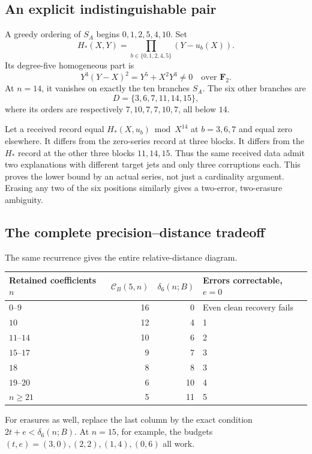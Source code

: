 \documentclass[11pt]{article}
\theoremstyle{definition}
\newcommand{\F}{\mathbf F}
\newcommand{\capv}{\mathcal C}
\begin{document}
\subsection{An explicit indistinguishable pair}

A greedy ordering of $S_A$ begins $0,1,2,5,4,10$. Set
\begin{equation}\label{eq:witness}
 H_*(X,Y)=\prod_{b\in\{0,1,2,4,5\}}(Y-u_b(X)).
\end{equation}
Its degree-five homogeneous part is
\[
 Y^3(Y-X)^2=Y^5+X^2Y^3\ne0\quad\text{over }\F_2.
\]
At $n=14$, it vanishes on exactly the ten branches $S_A$. The six other branches are
\[
 D=\{3,6,7,11,14,15\},
\]
where its orders are respectively $7,10,7,7,10,7$, all below $14$.

Let a received record equal $H_*(X,u_b)\bmod X^{14}$ at $b=3,6,7$ and equal zero elsewhere. It differs from the zero-series record at three blocks. It differs from the $H_*$ record at the other three blocks $11,14,15$. Thus the same received data admit two explanations with different target jets and only three corruptions each. This proves the lower bound by an actual series, not just a cardinality argument. Erasing any two of the six positions similarly gives a two-error, two-erasure ambiguity.

\subsection{The complete precision--distance tradeoff}

The same recurrence gives the entire relative-distance diagram.
\begin{center}
\begin{tabular}{@{}lrrl@{}}
\toprule
Retained coefficients $n$ & $\capv_B(5,n)$ & $\delta_6(n;B)$ & Errors correctable, $e=0$\\
\midrule
$0$--$9$ &16&0&Even clean recovery fails\\
$10$ &12&4&1\\
$11$--$14$ &10&6&2\\
$15$--$17$ &9&7&3\\
$18$ &8&8&3\\
$19$--$20$ &6&10&4\\
$n\ge21$ &5&11&5\\
\bottomrule
\end{tabular}
\end{center}
For erasures as well, replace the last column by the exact condition $2t+e<\delta_6(n;B)$. At $n=15$, for example, the budgets $(t,e)=(3,0),(2,2),(1,4),(0,6)$ all work.
\end{document}
